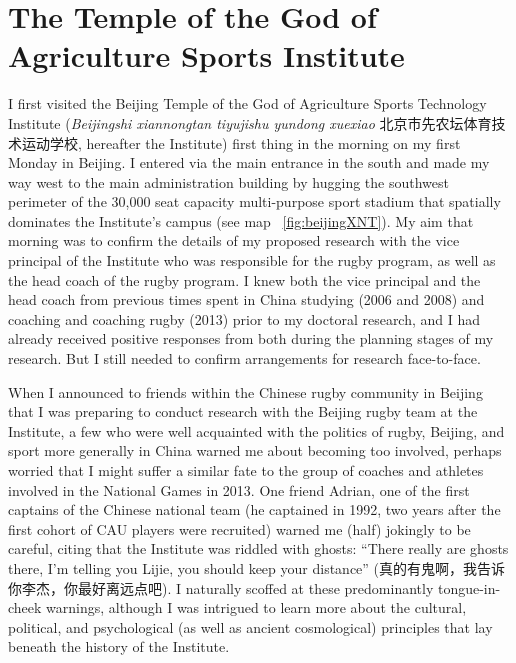\section{The Temple of the God of Agriculture Sports Institute}
I first visited the Beijing Temple of the God of Agriculture Sports Technology Institute (\textit{Beijingshi xiannongtan tiyujishu yundong xuexiao} 北京市先农坛体育技术运动学校,
hereafter the Institute) first thing in the morning on my first Monday in Beijing.  I entered via the main entrance in the south and made my way west to the main administration building by hugging the southwest perimeter of the 30,000 seat capacity multi-purpose sport stadium that spatially dominates the Institute's campus (see map ~\ref{fig:beijingXNT}). My aim that morning was to confirm the details of my proposed research with the vice principal of the Institute who was responsible for the rugby program, as well as the head coach of the rugby program.  I knew both the vice principal and the head coach from previous times spent in China studying (2006 and 2008) and coaching and coaching rugby (2013) prior to my doctoral research, and I had already received positive responses from both during the planning stages of my research.  But I still needed to confirm arrangements for research face-to-face.

When I announced to friends within the Chinese rugby community in Beijing that I was preparing to conduct research with the Beijing rugby team at the Institute, a few who were well acquainted with the politics of rugby, Beijing, and sport more generally in China warned me about becoming too involved, perhaps worried that I might suffer a similar fate to the group of coaches and athletes involved in the National Games in 2013.  One friend Adrian, one of the first captains of the Chinese national team (he captained in 1992, two years after the first cohort of CAU players were recruited) warned me (half) jokingly to be careful, citing that the Institute was riddled with ghosts: ``There really are ghosts there, I'm telling you Lijie, you should keep your distance'' (真的有鬼啊，我告诉你李杰，你最好离远点吧).  I naturally scoffed at these predominantly tongue-in-cheek warnings, although I was intrigued to learn more about the cultural, political, and psychological (as well as ancient cosmological) principles that lay beneath the history of the Institute.

